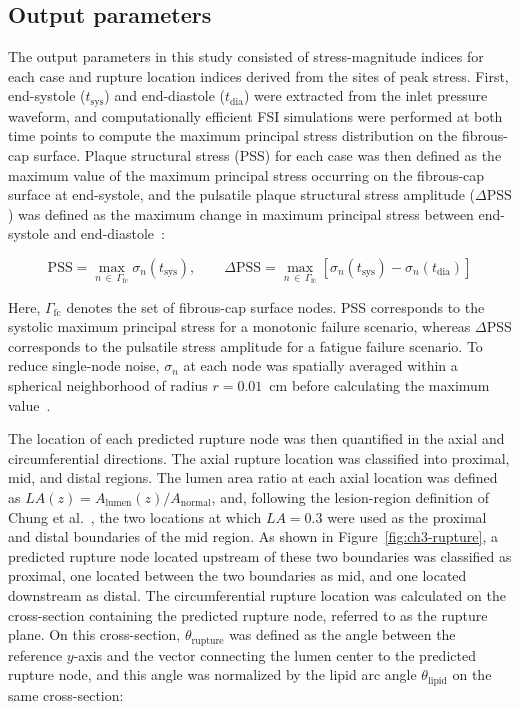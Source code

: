 \documentclass[master,english,final]{kaist-ucs}
\begin{document}
\subsection{Output parameters}
The output parameters in this study consisted of stress-magnitude indices for each case and rupture location indices derived from the sites of peak stress. First, end-systole ($t_\mathrm{sys}$) and end-diastole ($t_\mathrm{dia}$) were extracted from the inlet pressure waveform, and computationally efficient FSI simulations were performed at both time points to compute the maximum principal stress distribution on the fibrous-cap surface. Plaque structural stress (PSS) for each case was then defined as the maximum value of the maximum principal stress occurring on the fibrous-cap surface at end-systole, and the pulsatile plaque structural stress amplitude ($\Delta\mathrm{PSS}$) was defined as the maximum change in maximum principal stress between end-systole and end-diastole~\cite{gu2022, huang2021dpss, costopoulos2017}:

\begin{equation}
\mathrm{PSS} = \max_{n\,\in\,\Gamma_\mathrm{fc}} \sigma_n(t_\mathrm{sys}), \qquad \Delta\mathrm{PSS} = \max_{n\,\in\,\Gamma_\mathrm{fc}} \left[\sigma_n(t_\mathrm{sys}) - \sigma_n(t_\mathrm{dia})\right]
\end{equation}

Here, $\Gamma_\mathrm{fc}$ denotes the set of fibrous-cap surface nodes. PSS corresponds to the systolic maximum principal stress for a monotonic failure scenario, whereas $\Delta$PSS corresponds to the pulsatile stress amplitude for a fatigue failure scenario. To reduce single-node noise, $\sigma_n$ at each node was spatially averaged within a spherical neighborhood of radius $r=0.01$~cm before calculating the maximum value~\cite{corti2022}.

The location of each predicted rupture node was then quantified in the axial and circumferential directions. The axial rupture location was classified into proximal, mid, and distal regions. The lumen area ratio at each axial location was defined as $LA(z)=A_\mathrm{lumen}(z)/A_\mathrm{normal}$, and, following the lesion-region definition of Chung et al.~\cite{chung2017_LA}, the two locations at which $LA=0.3$ were used as the proximal and distal boundaries of the mid region. As shown in Figure~\ref{fig:ch3-rupture}, a predicted rupture node located upstream of these two boundaries was classified as proximal, one located between the two boundaries as mid, and one located downstream as distal. The circumferential rupture location was calculated on the cross-section containing the predicted rupture node, referred to as the rupture plane. On this cross-section, $\theta_\mathrm{rupture}$ was defined as the angle between the reference $y$-axis and the vector connecting the lumen center to the predicted rupture node, and this angle was normalized by the lipid arc angle $\theta_\mathrm{lipid}$ on the same cross-section:
\end{document}
